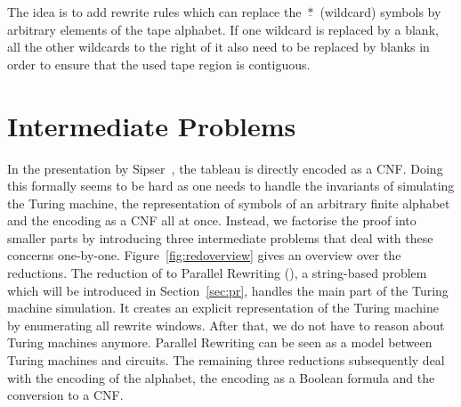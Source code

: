 \begin{center}
\end{center}

The idea is to add rewrite rules which can replace the $\underline{*}$ (wildcard) symbols by arbitrary elements of the tape alphabet. 
If one wildcard is replaced by a blank, all the other wildcards to the right of it also need to be replaced by blanks in order to ensure that the used tape region is contiguous. 

\section{Intermediate Problems}
In the presentation by Sipser~\cite{Sipser:TheoryofComputation}, the tableau is directly encoded as a CNF. Doing this formally seems to be hard as one needs to handle the invariants of simulating the Turing machine, the representation of symbols of an arbitrary finite alphabet and the encoding as a CNF all at once. 
Instead, we factorise the proof into smaller parts by introducing three intermediate problems that deal with these concerns one-by-one. 
Figure~\ref{fig:redoverview} gives an overview over the reductions.
The reduction of \gennp{} to Parallel Rewriting (\PR{}), a string-based problem which will be introduced in Section~\ref{sec:pr}, handles the main part of the Turing machine simulation. 
It creates an explicit representation of the Turing machine by enumerating all rewrite windows. After that, we do not have to reason about Turing machines anymore. 
Parallel Rewriting can be seen as a model between Turing machines and circuits.
The remaining three reductions subsequently deal with the encoding of the alphabet, the encoding as a Boolean formula and the conversion to a CNF.

